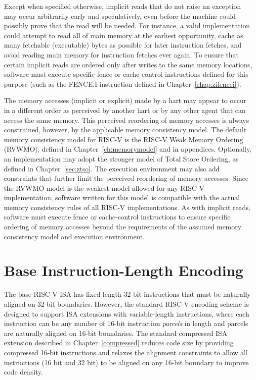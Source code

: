 Except when specified otherwise, implicit reads that do not raise an exception
may occur arbitrarily early and speculatively, even before the machine could
possibly prove that the read will be needed.  For instance, a valid
implementation could attempt to read all of main memory at the earliest
opportunity, cache as many fetchable (executable) bytes as possible for later
instruction fetches, and avoid reading main memory for instruction fetches ever
again.  To ensure that certain implicit reads are ordered only after writes to
the same memory locations, software must execute specific fence or cache-control
instructions defined for this purpose (such as the FENCE.I instruction
defined in Chapter~\ref{chap:zifencei}).

The memory accesses (implicit or explicit) made by a hart may appear to occur
in a different order as perceived by another hart or by any other agent that
can access the same memory.  This perceived reordering of memory accesses is
always constrained, however, by the applicable memory consistency model.  The
default memory consistency model for RISC-V is the RISC-V Weak Memory Ordering
(RVWMO), defined in Chapter~\ref{ch:memorymodel} and in appendices.
Optionally, an implementation may adopt the stronger model of Total Store
Ordering, as defined in Chapter~\ref{sec:ztso}.  The execution environment may
also add constraints that further limit the perceived reordering of memory
accesses.
Since the RVWMO model is the weakest model allowed for any RISC-V
implementation, software written for this model is compatible with the
actual memory consistency rules of all RISC-V implementations.  As with
implicit reads, software must execute fence or cache-control instructions to
ensure specific ordering of memory accesses beyond the requirements of the
assumed memory consistency model and execution environment.

\section{Base Instruction-Length Encoding}

The base RISC-V ISA has fixed-length 32-bit instructions that must be
naturally aligned on 32-bit boundaries.  However, the standard RISC-V
encoding scheme is designed to support ISA extensions with
variable-length instructions, where each instruction can be any number
of 16-bit instruction {\em parcels} in length and parcels are
naturally aligned on 16-bit boundaries.  The standard compressed ISA
extension described in Chapter~\ref{compressed} reduces code size by
providing compressed 16-bit instructions and relaxes the alignment
constraints to allow all instructions (16 bit and 32 bit) to be
aligned on any 16-bit boundary to improve code density.

